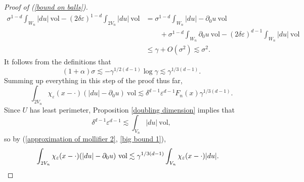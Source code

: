 \documentclass[reqno,12pt,letterpaper]{amsart}
\newcommand{\vol}{\mathrm{vol}}
\theoremstyle{definition}
\numberwithin{equation}{section}
\begin{document}
\begin{proof}[Proof of (\ref{bound on balls})]
\begin{align*}
\sigma^{1 - d} \int_{W_n} |du| ~\vol - (2\delta\varepsilon)^{1 - d} \int_{2V_n} |du| ~\vol &= \sigma^{1 - d} \int_{W_n} |du| - \partial_0u ~\vol \\
&\qquad + \sigma^{1 - d} \int_{W_n} \partial_0u ~\vol - (2\delta\varepsilon)^{d - 1} \int_{W_n} |du| ~\vol \\
&\leq \gamma + O(\sigma^2) \lesssim \sigma^2.
\end{align*}
It follows from the definitions that
$$(1 + \alpha)\sigma \lesssim -\gamma^{1/2(d - 1)} \log \gamma \lesssim \gamma^{1/3(d - 1)}.$$
Summing up everything in this step of the proof thus far,
\begin{equation}\label{big bound 1}
\int_{2V_n} \chi_\varepsilon(x - \cdot)(|du| - \partial_0u) ~\vol \lesssim \delta^{d - 1} \varepsilon^{d - 1} F_n(x) \gamma^{1/3(d - 1)}.
\end{equation}
Since $U$ has least perimeter, Proposition \ref{doubling dimension} implies that
$$\delta^{d - 1} \varepsilon^{d - 1} \lesssim \int_{V_n} |du| ~\vol,$$
so by (\ref{approximation of mollifier 2}, \ref{big bound 1}),
\begin{align*}
\int_{2V_n} \chi_\varepsilon(x - \cdot)(|du| - \partial_0u) ~\vol
&\lesssim \gamma^{1/3(d - 1)} \int_{V_n} \chi_\varepsilon(x - \cdot)|du|.
\qedhere \end{align*}
\end{proof}
\end{document}
